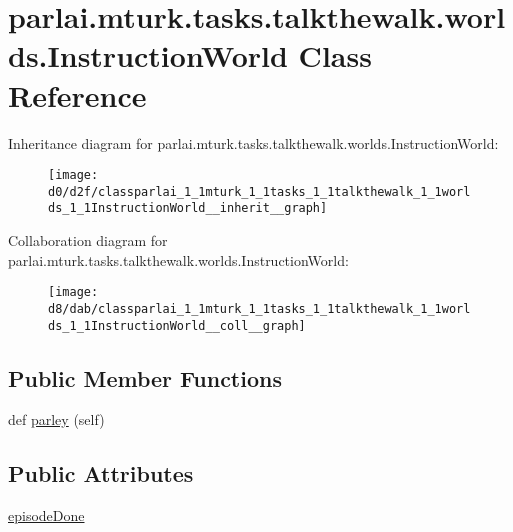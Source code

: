 \hypertarget{classparlai_1_1mturk_1_1tasks_1_1talkthewalk_1_1worlds_1_1InstructionWorld}{}\section{parlai.\+mturk.\+tasks.\+talkthewalk.\+worlds.\+Instruction\+World Class Reference}
\label{classparlai_1_1mturk_1_1tasks_1_1talkthewalk_1_1worlds_1_1InstructionWorld}


Inheritance diagram for parlai.\+mturk.\+tasks.\+talkthewalk.\+worlds.\+Instruction\+World\+:
\nopagebreak
\begin{figure}[H]
\begin{center}
\leavevmode
\texttt{[image: d0/d2f/classparlai\_1\_1mturk\_1\_1tasks\_1\_1talkthewalk\_1\_1worlds\_1\_1InstructionWorld\_\_inherit\_\_graph]}
\end{center}
\end{figure}


Collaboration diagram for parlai.\+mturk.\+tasks.\+talkthewalk.\+worlds.\+Instruction\+World\+:
\nopagebreak
\begin{figure}[H]
\begin{center}
\leavevmode
\texttt{[image: d8/dab/classparlai\_1\_1mturk\_1\_1tasks\_1\_1talkthewalk\_1\_1worlds\_1\_1InstructionWorld\_\_coll\_\_graph]}
\end{center}
\end{figure}
\subsection*{Public Member Functions}
\begin{DoxyCompactItemize}
\item 
def \hyperlink{classparlai_1_1mturk_1_1tasks_1_1talkthewalk_1_1worlds_1_1InstructionWorld_a06b05ffcdf06af461c8f0d7b916d0d45}{parley} (self)
\end{DoxyCompactItemize}
\subsection*{Public Attributes}
\begin{DoxyCompactItemize}
\item 
\hyperlink{classparlai_1_1mturk_1_1tasks_1_1talkthewalk_1_1worlds_1_1InstructionWorld_aaf59ed0ca8d4a2078e0e312279e5e646}{episode\+Done}
\end{DoxyCompactItemize}


